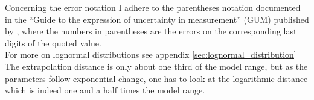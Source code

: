 Concerning the error notation I adhere to the parentheses notation documented in the ``Guide to the expression of uncertainty in measurement'' (GUM) published by \citet{GUM2008}, where the numbers in parentheses are the errors on the corresponding last digits of the quoted value.\\

For more on lognormal distributions see appendix \autoref{sec:lognormal_distribution}\\





The extrapolation distance is only about one third of the model range, but as the parameters follow exponential change, one has to look at the logarithmic distance which is indeed one and a half times the model range.\\



